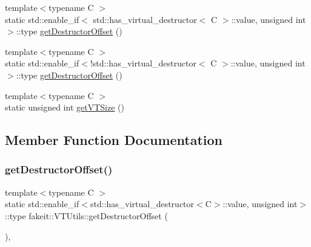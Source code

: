 \begin{DoxyCompactItemize}
\item 
{\footnotesize template$<$typename C $>$ }\\static std\+::enable\+\_\+if$<$ std\+::has\+\_\+virtual\+\_\+destructor$<$ C $>$\+::value, unsigned int $>$\+::type \mbox{\hyperlink{classfakeit_1_1VTUtils_a9c71030f6040b59ec03cbe326ae1d654}{get\+Destructor\+Offset}} ()
\item 
{\footnotesize template$<$typename C $>$ }\\static std\+::enable\+\_\+if$<$!std\+::has\+\_\+virtual\+\_\+destructor$<$ C $>$\+::value, unsigned int $>$\+::type \mbox{\hyperlink{classfakeit_1_1VTUtils_ac13eea89df8b1656a1bedb9a9bb5c518}{get\+Destructor\+Offset}} ()
\item 
{\footnotesize template$<$typename C $>$ }\\static unsigned int \mbox{\hyperlink{classfakeit_1_1VTUtils_a54ddc7bb539671fbf957920f051a6104}{get\+V\+T\+Size}} ()
\end{DoxyCompactItemize}


\subsection{Member Function Documentation}
\mbox{\label{classfakeit_1_1VTUtils_a9c71030f6040b59ec03cbe326ae1d654}} 
\subsubsection{\texorpdfstring{getDestructorOffset()}{getDestructorOffset()}\hspace{0.1cm}{\footnotesize\ttfamily [1/18]}}
{\footnotesize\ttfamily template$<$typename C $>$ \\
static std\+::enable\+\_\+if$<$std\+::has\+\_\+virtual\+\_\+destructor$<$C$>$\+::value, unsigned int$>$\+::type fakeit\+::\+V\+T\+Utils\+::get\+Destructor\+Offset (\begin{DoxyParamCaption}{ }\end{DoxyParamCaption})\hspace{0.3cm}{\ttfamily [inline]}, {\ttfamily [static]}}

\mbox{\label{classfakeit_1_1VTUtils_ac13eea89df8b1656a1bedb9a9bb5c518}} 
